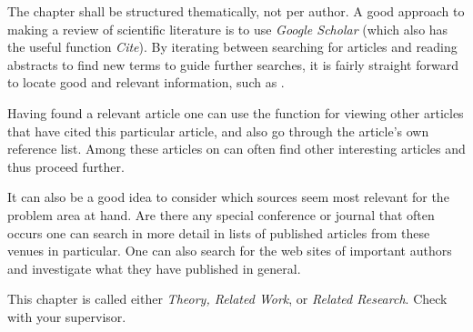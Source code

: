 The chapter shall be structured thematically, not per author.
A good approach to making a review of scientific literature
is to use \emph{Google Scholar} (which also has the useful function
\emph{Cite}). By iterating between searching for articles and reading
abstracts to find new terms to guide further searches, it is
fairly straight forward to locate good and relevant
information, such as \cite{test}.

Having found a relevant article one can use the function for
viewing other articles that have cited this particular article,
and also go through the article’s own reference list. Among
these articles on can often find other interesting articles and
thus proceed further.

It can also be a good idea to consider which sources seem
most relevant for the problem area at hand. Are there any
special conference or journal that often occurs one can search
in more detail in lists of published articles from these venues
in particular. One can also search for the web sites of
important authors and investigate what they have published
in general.

This chapter is called either \emph{Theory, Related Work}, or
\emph{Related Research}. Check with your supervisor.
\fi
